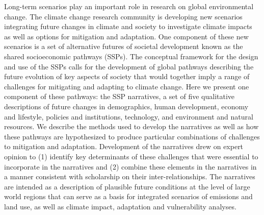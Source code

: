 Long-term scenarios play an important role in research on global environmental change. The climate change research community is developing new scenarios integrating future changes in climate and society to investigate climate impacts as well as options for mitigation and adaptation. One component of these new scenarios is a set of alternative futures of societal development known as the shared socioeconomic pathways (SSPs). The conceptual framework for the design and use of the SSPs calls for the development of global pathways describing the future evolution of key aspects of society that would together imply a range of challenges for mitigating and adapting to climate change. Here we present one component of these pathways: the SSP narratives, a set of five qualitative descriptions of future changes in demographics, human development, economy and lifestyle, policies and institutions, technology, and environment and natural resources. We describe the methods used to develop the narratives as well as how these pathways are hypothesized to produce particular combinations of challenges to mitigation and adaptation. Development of the narratives drew on expert opinion to (1) identify key determinants of these challenges that were essential to incorporate in the narratives and (2) combine these elements in the narratives in a manner consistent with scholarship on their inter-relationships. The narratives are intended as a description of plausible future conditions at the level of large world regions that can serve as a basis for integrated scenarios of emissions and land use, as well as climate impact, adaptation and vulnerability analyses.